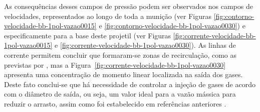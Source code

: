 As consequências desses campos de pressão podem ser observados nos campos de velocidades, representados ao longo de toda a munição (ver Figuras \ref{fig:contorno-velocidade-bb-1pol-vazao0015} e \ref{fig:contorno-velocidade-bb-1pol-vazao0030}) e especificamente para a base deste projetil (ver Figuras \ref{fig:corrente-velocidade-bb-1pol-vazao0015} e \ref{fig:corrente-velocidade-bb-1pol-vazao0030}). As linhas de corrente permitem concluir que formaram-se zonas de recirculação, como as previstas por \cite{Sahu1985}, mas a Figura~\ref{fig:corrente-velocidade-bb-1pol-vazao0030} apresenta uma concentração de momento linear localizada na saída dos gases. Deste fato conclui-se que há necessidade de controlar a injeção de gases de acordo com o diâmetro de saída, ou seja, um valor ideal para a vazão mássica para reduzir o arrasto, assim como foi estabelecido em referências anteriores \cite{Andersson1976,Gunners1988}. 


